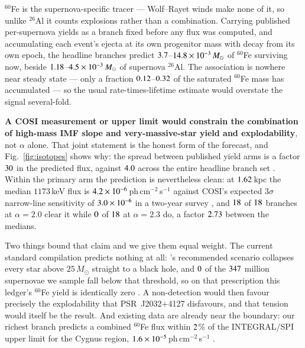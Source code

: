 \documentclass{aa}
\begin{document}
$^{60}$Fe is the supernova-specific tracer --- Wolf--Rayet winds make none of it,
so unlike $^{26}$Al it counts explosions rather than a combination. Carrying
published per-supernova yields as a branch fixed before any flux was computed,
and accumulating each event's ejecta at its own progenitor mass with decay from
its own epoch, the headline branches predict
$3.7$--$14.8\times10^{-3}\,M_\odot$ of $^{60}$Fe surviving now, beside
$1.18$--$4.5\times10^{-3}\,M_\odot$ of supernova $^{26}$Al. The
association is nowhere near steady state --- only a fraction
$0.12$--$0.32$ of the saturated $^{60}$Fe mass has accumulated ---
so the usual rate-times-lifetime estimate would overstate the signal
several-fold.

\textbf{A COSI measurement or upper limit would constrain the combination of
high-mass IMF slope and very-massive-star yield and explodability}, not $\alpha$
alone. That joint statement is the honest form of the forecast, and
Fig.~\ref{fig:isotopes} shows why: the spread between published yield arms is a
factor $30$ in the predicted flux, against $4.0$ across
the entire headline branch set \citep{limongi2006}. Within the primary arm the
prediction is nevertheless clean: at $1.62$\,kpc the median $1173$\,keV
flux is $4.2\times10^{-6}$\,ph\,cm$^{-2}$\,s$^{-1}$ against COSI's
expected $3\sigma$ narrow-line sensitivity of $3.0\times10^{-6}$ in a
two-year survey \citep{tomsick2023}, and $18$ of $18$
branches at $\alpha = 2.0$ clear it while $0$ of
$18$ at $\alpha = 2.3$ do, a factor $2.73$ between the
medians.

Two things bound that claim and we give them equal weight. The current standard
compilation predicts nothing at all: \citet{limongi2018}'s recommended scenario
collapses every star above $25\,M_\odot$ straight to a black hole, and
$0$ of the $347$ million supernovae we sample fall below
that threshold, so on that prescription this ledger's $^{60}$Fe yield is
identically zero \citep{falla2025}. A non-detection would then favour precisely
the explodability that PSR~J2032+4127 disfavours, and that tension would itself
be the result. And existing data are already near the boundary: our richest
branch predicts a combined $^{60}$Fe flux within $2$\% of the
INTEGRAL/SPI upper limit for the Cygnus region,
$1.6\times10^{-5}$\,ph\,cm$^{-2}$\,s$^{-1}$ \citep{martin2009}.
\end{document}
